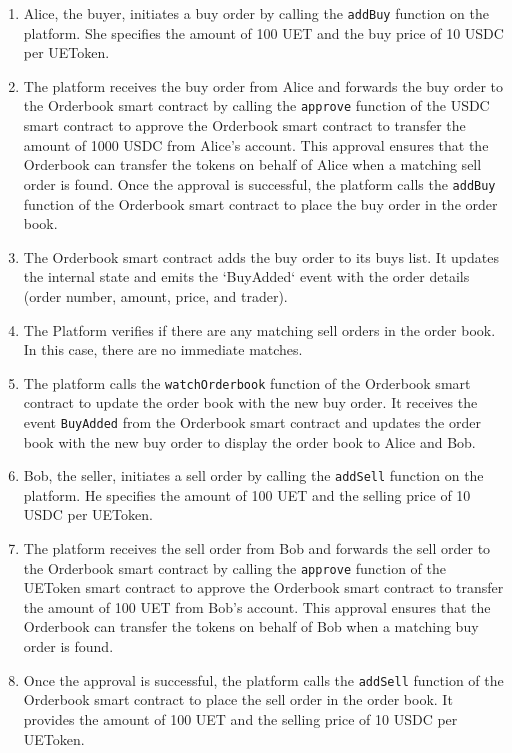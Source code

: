 \begin{enumerate}
   \item Alice, the buyer, initiates a buy order by calling the \texttt{addBuy} function on the platform. She specifies the amount of
   100 UET and the buy price of 10 USDC per UEToken.
   \item The platform receives the buy order from Alice and forwards the buy order to the Orderbook smart contract by calling the \texttt{approve} function
   of the USDC smart contract to approve the Orderbook smart contract to transfer the amount of 1000 USDC from Alice's account. This approval ensures that the Orderbook can
   transfer the tokens on behalf of Alice when a matching sell order is found.
   Once the approval is successful, the platform calls the \texttt{addBuy} function of the Orderbook smart contract to place the buy order in the order book.
   \item The Orderbook smart contract adds the buy order to its buys list. It updates the internal state and emits the `BuyAdded` event with the order details (order number, amount, price, and trader).
   \item The Platform verifies if there are any matching sell orders in the order book. In this case, there are no immediate matches.
   \item The platform calls the \texttt{watchOrderbook} function of the Orderbook smart contract to update the order book with the new buy order. It receives
   the event \texttt{BuyAdded} from the Orderbook smart contract and updates the order book with the new buy order to display the order book to Alice and Bob.
   \item Bob, the seller, initiates a sell order by calling the \texttt{addSell} function on the platform. He specifies the amount of 100 UET and the selling price of 10 USDC per UEToken.
   \item The platform receives the sell order from Bob and forwards the sell order to the Orderbook smart contract by calling the \texttt{approve} function
   of the UEToken smart contract to approve the Orderbook smart contract to transfer the amount of 100 UET from Bob's account. This approval ensures that the Orderbook can
   transfer the tokens on behalf of Bob when a matching buy order is found.
   \item Once the approval is successful, the platform calls the \texttt{addSell} function of the Orderbook smart contract to place the sell order in the order book.
   It provides the amount of 100 UET and the selling price of 10 USDC per UEToken.

\end{enumerate}
